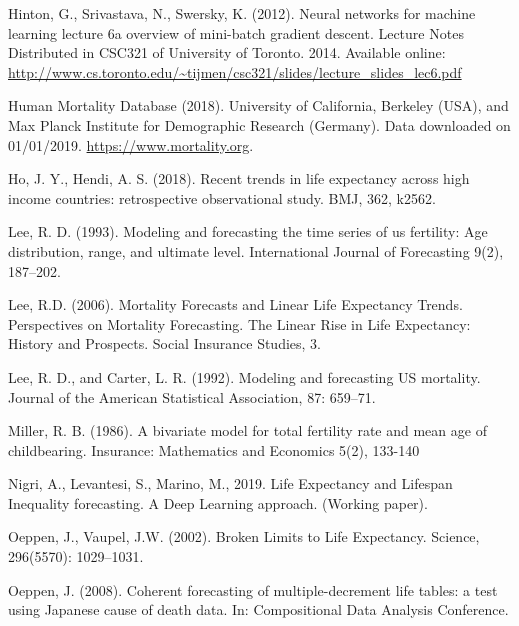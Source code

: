 \documentclass[a4,11pt]{article}
\begin{document}
\begin{thebibliography}{99}
Hinton, G., Srivastava, N., Swersky, K. (2012). Neural networks for machine learning lecture 6a overview of mini-batch gradient descent. 
Lecture Notes Distributed in CSC321 of University of Toronto. 2014. Available online: \url{http://www.cs.toronto.edu/~tijmen/csc321/slides/lecture_slides_lec6.pdf}

Human Mortality Database (2018). University of California, Berkeley (USA), and Max Planck Institute for Demographic Research (Germany). Data downloaded on 01/01/2019. 
\url{https://www.mortality.org}.

Ho, J. Y., Hendi, A. S. (2018). Recent trends in life expectancy across high income countries: retrospective observational study. BMJ, 362, k2562.

	
Lee, R. D. (1993). Modeling and forecasting the time series of us fertility: Age distribution, range, and ultimate level. International Journal of Forecasting 9(2), 187–202.

Lee, R.D. (2006). Mortality Forecasts and Linear Life Expectancy Trends. Perspectives on Mortality Forecasting. The Linear Rise in Life Expectancy: History and Prospects. Social Insurance Studies, 3. 

Lee, R. D., and Carter, L. R. (1992). Modeling and forecasting US mortality. Journal of the American Statistical Association, 87: 659--71.

Miller, R. B. (1986). A bivariate model for total fertility rate and mean age of childbearing. Insurance: Mathematics and Economics 5(2), 133-140
	
Nigri, A., Levantesi, S., Marino, M.,  2019. Life Expectancy and Lifespan Inequality forecasting. A Deep Learning approach. (Working paper). 
		
Oeppen, J., Vaupel, J.W. (2002). Broken Limits to Life Expectancy. Science, 296(5570): 1029--1031. 

Oeppen, J. (2008). Coherent forecasting of multiple-decrement life tables: a test using Japanese cause of death data. In: Compositional Data Analysis Conference.
		

\end{thebibliography}
\end{document}
